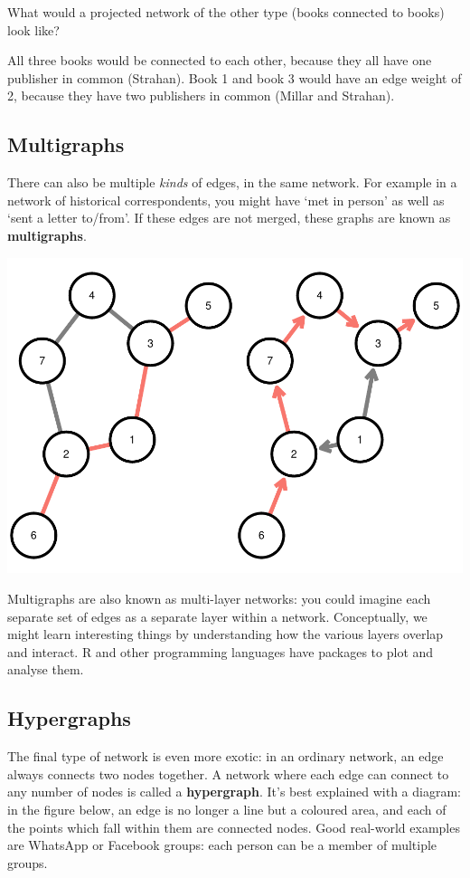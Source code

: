 \documentclass[
]{book}
\begin{document}
What would a projected network of the other type (books connected to books) look like?

All three books would be connected to each other, because they all have one publisher in common (Strahan). Book 1 and book 3 would have an edge weight of 2, because they have two publishers in common (Millar and Strahan).

\hypertarget{multigraphs}{%
\subsection{Multigraphs}\label{multigraphs}}

There can also be multiple \emph{kinds} of edges, in the same network. For example in a network of historical correspondents, you might have `met in person' as well as `sent a letter to/from'. If these edges are not merged, these graphs are known as \textbf{multigraphs}.

\includegraphics{_main_files/figure-latex/unnamed-chunk-1-1.pdf}

Multigraphs are also known as multi-layer networks: you could imagine each separate set of edges as a separate layer within a network. Conceptually, we might learn interesting things by understanding how the various layers overlap and interact. R and other programming languages have packages to plot and analyse them.

\hypertarget{hypergraphs}{%
\subsection{Hypergraphs}\label{hypergraphs}}

The final type of network is even more exotic: in an ordinary network, an edge always connects two nodes together. A network where each edge can connect to any number of nodes is called a \textbf{hypergraph}. It's best explained with a diagram: in the figure below, an edge is no longer a line but a coloured area, and each of the points which fall within them are connected nodes. Good real-world examples are WhatsApp or Facebook groups: each person can be a member of multiple groups.
\end{document}
